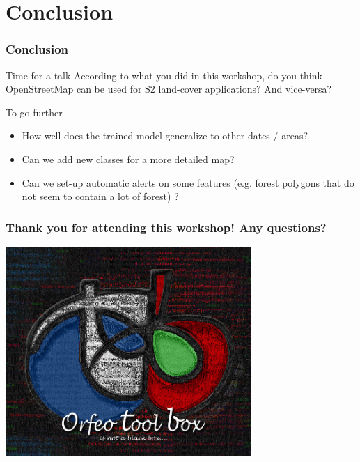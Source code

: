 \documentclass[8pt]{beamer}
\begin{document}
\section*{Conclusion}

\begin{frame}
\frametitle{Conclusion}
\begin{block}{Time for a talk}
According to what you did in this workshop, do you think OpenStreetMap
can be used for S2 land-cover applications? And vice-versa?
\end{block}

\begin{block}{To go further}
\begin{itemize}
\item How well does the trained model generalize to other dates / areas?
\item Can we add new classes for a more detailed map?
\item Can we set-up automatic alerts on some features (e.g. forest polygons that do not seem to contain a lot of forest) ?
\end{itemize}
\end{block}

\end{frame}

\begin{frame}
\frametitle{Thank you for attending this workshop! Any questions?}
\begin{minipage}[t][6cm][t]{\textwidth}
\begin{center}
\includegraphics[width=0.7\textwidth]{../OTB-General/images/LOGOTB_blackbox.png}
\end{center}
\end{minipage}
\end{frame}
\end{document}
